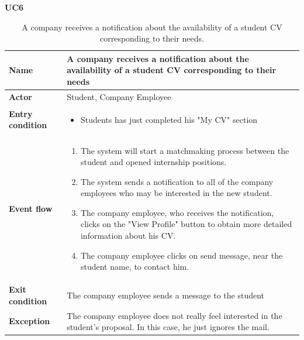     \textbf{UC6}
    \nopagebreak
    \begin{table}[H]
        \centering
        \begin{tabular}{|l|p{11.9cm}|}
        \hline
        \textbf{Name}            & A company receives a notification about the availability of a student CV corresponding to their needs \\\hline
        \textbf{Actor}           & Student, Company Employee       \\\hline
        \textbf{Entry condition} &
        \begin{itemize}
              \item Students has just completed his "My CV" section
        \end{itemize}                                        \\\hline
        \textbf{Event flow}      &
        \begin{enumerate}[label=\arabic*.]
              \item The system will start a matchmaking process between the student and opened internship positions.
              \item The system sends a notification to all of the company employees who may be interested in the new student.
              \item The company employee, who receives the notification, clicks on the "View Profile" button to obtain more detailed information about his CV.
              \item The company employee clicks on send message, near the student name, to contact him.
              
        \end{enumerate}            \\\hline
        \textbf{Exit condition}  & The company employee sends a message to the student  \\\hline
        \textbf{Exception}       &  The company employee does not really feel interested in the student's proposal. In this case, he just ignores the mail.   \\\hline
        \end{tabular}
        \caption{A company receives a notification about the availability of a student CV corresponding to their needs.}
        \label{table:A company receive a notification about the availability of a student CV corresponding to their needs}
    \end{table}

